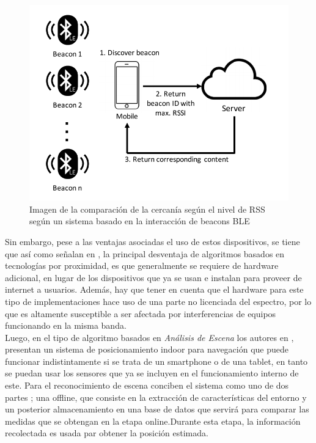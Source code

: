 \begin{figure}[h!]
    \centering
    \includegraphics[scale=0.3]{./images/beacon}
    \caption{Imagen de la comparación de la cercanía según el nivel de RSS según un sistema basado en la interacción de beacons BLE}
    \label{fig:my_label}
\end{figure}

Sin embargo, pese a las ventajas asociadas el uso de estos dispositivos, se tiene que así como señalan en \cite{1}, la principal desventaja de algoritmos basados en tecnologías por proximidad, es que generalmente se requiere de hardware adicional, en lugar de los dispositivos que ya se usan e instalan para proveer de internet a usuarios. Además, hay que tener en cuenta que el hardware para este tipo de implementaciones hace uso de una parte no licenciada del espectro, por lo que es altamente susceptible a ser afectada por interferencias de equipos funcionando en la misma banda.\\

Luego, en el tipo de algoritmo basados en \textit{Análisis de Escena} los autores en \cite{1}, presentan un sistema de posicionamiento indoor para navegación que puede funcionar indistintamente si se trata de un smartphone o de una tablet, en tanto se puedan usar los sensores que ya se incluyen en el funcionamiento interno de este. Para el reconocimiento de escena conciben el sistema como uno de dos partes \cite{8}; una offline, que consiste en la extracción de características del entorno y un posterior almacenamiento en una base de datos que servirá para comparar las medidas que se obtengan en la etapa online.Durante esta etapa, la información recolectada es usada par obtener la posición estimada.\\

